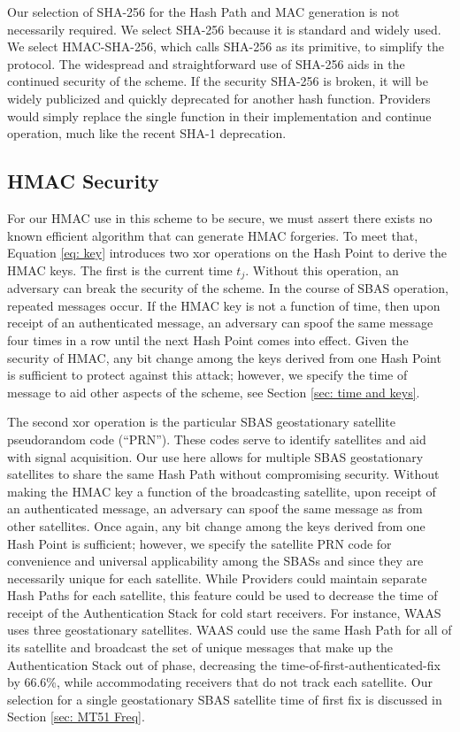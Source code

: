\documentclass[letterpaper,times]{IONconf/IONconf}
\begin{document}
Our selection of SHA-256 for the Hash Path and MAC generation is not necessarily required.
We select SHA-256 because it is standard and widely used.
We select HMAC-SHA-256, which calls SHA-256 as its primitive, to simplify the protocol.
The widespread and straightforward use of SHA-256 aids in the continued security of the scheme.
If the security SHA-256 is broken, it will be widely publicized and quickly deprecated for another hash function.
Providers would simply replace the single function in their implementation and continue operation, much like the recent SHA-1 deprecation.

\subsection{HMAC Security} \label{sec: HMAC security}

For our HMAC use in this scheme to be secure, we must assert there exists no known efficient algorithm that can generate HMAC forgeries.
To meet that, Equation \ref{eq: key} introduces two xor operations on the Hash Point to derive the HMAC keys.
The first is the current time $t_j$.
Without this operation, an adversary can break the security of the scheme.
In the course of SBAS operation, repeated messages occur.
If the HMAC key is not a function of time, then upon receipt of an authenticated message, an adversary can spoof the same message four times in a row until the next Hash Point comes into effect.
Given the security of HMAC, any bit change among the keys derived from one Hash Point is sufficient to protect against this attack; however, we specify the time of message to aid other aspects of the scheme, see Section \ref{sec: time and keys}.

The second xor operation is the particular SBAS geostationary satellite pseudorandom code (``PRN'').
These codes serve to identify satellites and aid with signal acquisition.
Our use here allows for multiple SBAS geostationary satellites to share the same Hash Path without compromising security.
Without making the HMAC key a function of the broadcasting satellite, upon receipt of an authenticated message, an adversary can spoof the same message as from other satellites.
Once again, any bit change among the keys derived from one Hash Point is sufficient; however, we specify the satellite PRN code for convenience and universal applicability among the SBASs and since they are necessarily unique for each satellite.
While Providers could maintain separate Hash Paths for each satellite, this feature could be used to decrease the time of receipt of the Authentication Stack for cold start receivers.
For instance, WAAS uses three geostationary satellites.
WAAS could use the same Hash Path for all of its satellite and broadcast the set of unique messages that make up the Authentication Stack out of phase, decreasing the time-of-first-authenticated-fix by 66.6\%, while accommodating receivers that do not track each satellite.
Our selection for a single geostationary SBAS satellite time of first fix is discussed in Section \ref{sec: MT51 Freq}.
\end{document}
